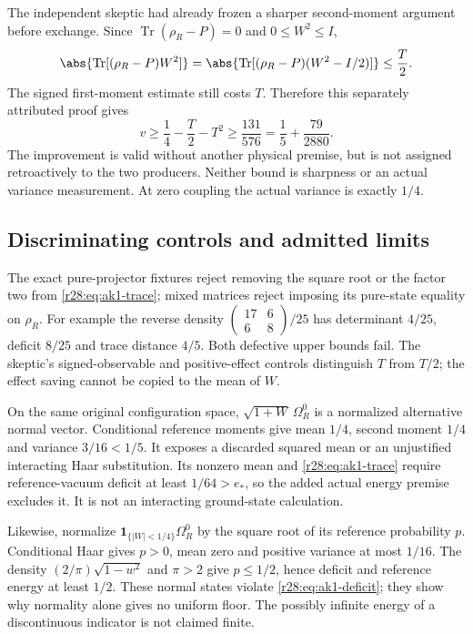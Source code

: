 The independent skeptic had already frozen a sharper second-moment argument before exchange. Since $\operatorname{Tr}(\rho_R-P)=0$ and $0\le W^2\le I$,
\begin{equation}
 \abs{\operatorname{Tr}[(\rho_R-P)W^2]}
 =\abs{\operatorname{Tr}[(\rho_R-P)(W^2-I/2)]}
 \le\frac T2.
 \label{r28:eq:ak1-effect}
\end{equation}
The signed first-moment estimate still costs $T$. Therefore this separately attributed proof gives
\begin{equation}
 v\ge\frac14-\frac T2-T^2
 \ge\frac{131}{576}=\frac15+\frac{79}{2880}.
 \label{r28:eq:ak1-skeptic-floor}
\end{equation}
The improvement is valid without another physical premise, but is not assigned retroactively to the two producers. Neither bound is sharpness or an actual variance measurement. At zero coupling the actual variance is exactly $1/4$.

\subsection{Discriminating controls and admitted limits}
The exact pure-projector fixtures reject removing the square root or the factor two from \eqref{r28:eq:ak1-trace}; mixed matrices reject imposing its pure-state equality on $\rho_R$. For example the reverse density $\left(\begin{smallmatrix}17&6\\6&8\end{smallmatrix}\right)/25$ has determinant $4/25$, deficit $8/25$ and trace distance $4/5$. Both defective upper bounds fail. The skeptic's signed-observable and positive-effect controls distinguish $T$ from $T/2$; the effect saving cannot be copied to the mean of $W$.

On the same original configuration space, $\sqrt{1+W}\,\Omega_R^0$ is a normalized alternative normal vector. Conditional reference moments give mean $1/4$, second moment $1/4$ and variance $3/16<1/5$. It exposes a discarded squared mean or an unjustified interacting Haar substitution. Its nonzero mean and \eqref{r28:eq:ak1-trace} require reference-vacuum deficit at least $1/64>e_*$, so the added actual energy premise excludes it. It is not an interacting ground-state calculation.

Likewise, normalize $\mathbf1_{\{|W|<1/4\}}\Omega_R^0$ by the square root of its reference probability $p$. Conditional Haar gives $p>0$, mean zero and positive variance at most $1/16$. The density $(2/\pi)\sqrt{1-w^2}$ and $\pi>2$ give $p\le1/2$, hence deficit and reference energy at least $1/2$. These normal states violate \eqref{r28:eq:ak1-deficit}; they show why normality alone gives no uniform floor. The possibly infinite energy of a discontinuous indicator is not claimed finite.

